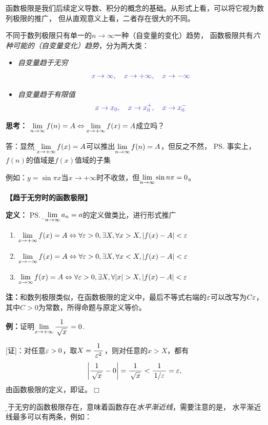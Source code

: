 函数极限是我们后续定义导数、积分的概念的基础。从形式上看，可以将它视为数列极限的推广，
但从直观意义上看，二者存在很大的不同。

不同于数列极限只有单一的$n\to\infty$一种（自变量的变化）趋势，
函数极限共有{\it 六种可能的（自变量变化）趋势}，分为两大类：

\begin{itemize}
  \setlength{\itemindent}{1cm}
  \item {\it 自变量趋于无穷}
  $$\b x\to\infty,\quad x\to+\infty,\quad x\to-\infty$$
  \item {\it 自变量趋于有限值}
  $$\b x\to x_0,\quad x\to x_0^+,\quad x\to x_0^-$$
\end{itemize}

{\bf 思考：} $\lim\limits_{n\to\infty} f(n)=A\Leftrightarrow\lim\limits_{x\to{+\infty}}f(x)=A$成立吗？

答：显然，{\b$\lim\limits_{x\to{+\infty}}f(x)=A$可以推出$\lim\limits_{n\to\infty} f(n)=A$，但反之不然}，
\ps{事实上，$f(n)$的值域是$f(x)$值域的子集}

例如：$y=\sin\pi x$当$x\to+\infty$时不收敛，但$\lim\limits_{n\to\infty}\sin n\pi=0$。

{\bf 【趋于无穷时的函数极限】}

{\bf 定义：}
\ps{\b 和$\lim\limits_{n\to\infty} a_n=a$的定义做类比，进行形式推广}
\begin{enumerate}[(1)]
  \setlength{\itemindent}{1cm}
  \item $\lim\limits_{x\to{+\infty}}f(x)=A\Leftrightarrow\forall \varepsilon>0,\exists X,\forall
  x>X,|f(x)-A|<\varepsilon$
  \item $\lim\limits_{x\to{-\infty}}f(x)=A\Leftrightarrow\forall \varepsilon>0,\exists X,\forall
  x<X,|f(x)-A|<\varepsilon$
  \item $\limx{\infty}f(x)=A\Leftrightarrow\forall \e>0,\exists X,\forall
  |x|>X,|f(x)-A|<\e$
\end{enumerate}

{\bf 注：}和数列极限类似，在函数极限的定义中，最后不等式右端的$\varepsilon$可以改写为$C\varepsilon$，
其中$C>0$为常数，所得命题与原定义等价。

{\bf 例：}证明$\lim\limits_{x\to{+\infty}}\displaystyle\frac{\,{1}\,}{\,{\sqrt x}\,}=0$.

[证]：对任意$\varepsilon>0$，取$X=\displaystyle\frac{\,{1}\,}{\,{\varepsilon^2}\,}$，则对任意的$x>X$，都有
$$\left|\displaystyle\frac{\,{1}\,}{\,{\sqrt x}\,}-0\right|=\displaystyle\frac{\,{1}\,}{\,{\sqrt x}\,}<\displaystyle\frac{\,{1}\,}{\,{1/\varepsilon}\,}=\varepsilon,$$
由函数极限的定义，即证。\hfill $\Box$

{\b 趋于无穷的函数极限存在，意味着函数存在{\it 水平渐近线}}，需要注意的是，
水平渐近线最多可以有两条，例如：


